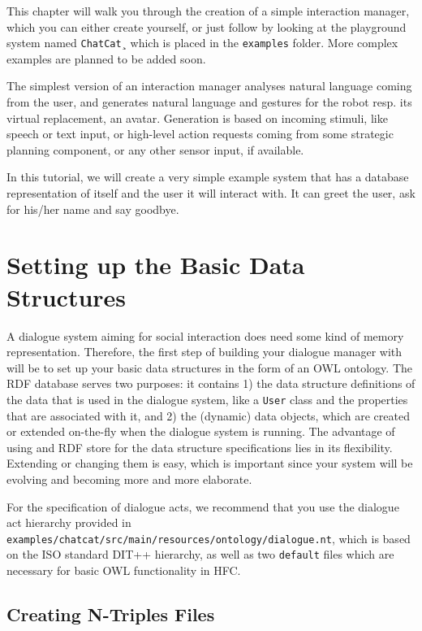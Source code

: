 This chapter will walk you through the creation of a simple interaction
manager, which you can either create yourself, or just follow by looking at the
playground system named \texttt{ChatCat}¸ which is placed in the
\texttt{examples} folder. More complex examples are planned to be added soon.

The simplest version of an interaction manager analyses natural language
coming from the user, and generates natural language and gestures for the robot
resp. its virtual replacement, an avatar. Generation is based on incoming
stimuli, like speech or text input, or high-level action requests coming from
some strategic planning component, or any other sensor input, if available.

In this tutorial, we will create a very simple example system that has a
database representation of itself and the user it will interact with. It can
greet the user, ask for his/her name and say goodbye.

\section{Setting up the Basic Data Structures}
\label{sec:example-hfc}

A dialogue system aiming for social interaction does need some kind of memory
representation. Therefore, the first step of building your dialogue manager
with \vonda will be to set up your basic data structures in the form of an OWL
ontology. The RDF database serves two purposes: it contains 1) the data
structure definitions of the data that is used in the dialogue system, like a
\texttt{User} class and the properties that are associated with it, and 2) the
(dynamic) data objects, which are created or extended on-the-fly when the
dialogue system is running. The advantage of using and RDF store for the data
structure specifications lies in its flexibility. Extending or changing them is
easy, which is important since your system will be evolving and becoming more
and more elaborate.

For the specification of dialogue acts, we recommend that you use the dialogue
act hierarchy provided in
\texttt{examples/chatcat/src/main/resources/ontology/dialogue.nt}, which is
based on the ISO standard DIT++ hierarchy, as well as two \texttt{default}
files which are necessary for basic OWL functionality in HFC.

\subsection{Creating N-Triples Files}

